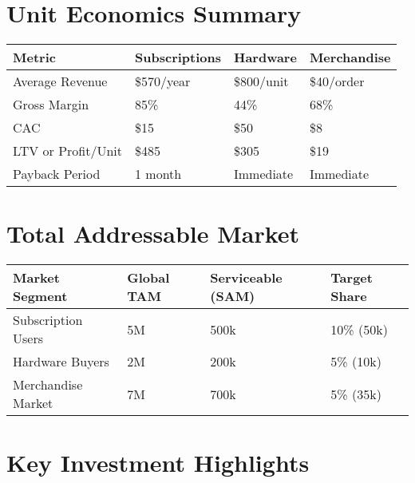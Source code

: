 \documentclass[11pt]{article}
\begin{document}
\section{Unit Economics Summary}

\begin{table}[htbp]
\centering
\begin{tabularx}{\linewidth}{l Y Y Y}
\toprule
Metric & Subscriptions & Hardware & Merchandise \\\midrule
Average Revenue & \$570/year & \$800/unit & \$40/order \\
Gross Margin & 85\% & 44\% & 68\% \\
CAC & \$15 & \$50 & \$8 \\
LTV or Profit/Unit & \$485 & \$305 & \$19 \\
Payback Period & 1 month & Immediate & Immediate \\
\bottomrule
\end{tabularx}
\end{table}

\section{Total Addressable Market}

\begin{table}[htbp]
\centering
\begin{tabularx}{\linewidth}{l Y Y Y}
\toprule
Market Segment & Global TAM & Serviceable (SAM) & Target Share \\\midrule
Subscription Users & 5M & 500k & 10\% (50k) \\
Hardware Buyers & 2M & 200k & 5\% (10k) \\
Merchandise Market & 7M & 700k & 5\% (35k) \\
\bottomrule
\end{tabularx}
\end{table}

\section{Key Investment Highlights}
\end{document}
